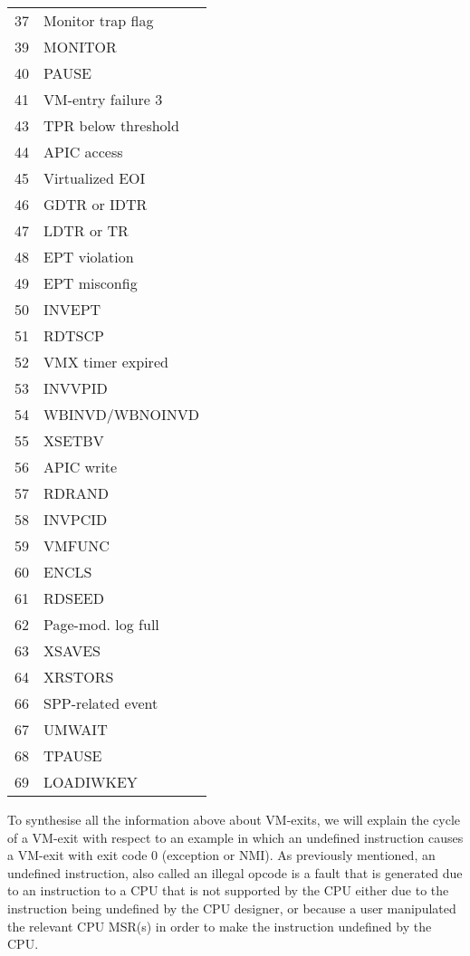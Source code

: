 \documentclass{report}
\begin{document}
\begin{spacing}{1.5}
\begin{longtable}{|c|l|}
\large{37} & \large{Monitor trap flag} \\
\large{39} & \large{MONITOR} \\
\large{40} & \large{PAUSE} \\
\large{41} & \large{VM-entry failure 3} \\
\large{43} & \large{TPR below threshold} \\
\large{44} & \large{APIC access} \\
\large{45} & \large{Virtualized EOI} \\
\large{46} & \large{GDTR or IDTR} \\
\large{47} & \large{LDTR or TR} \\
\large{48} & \large{EPT violation} \\
\large{49} & \large{EPT misconfig} \\
\large{50} & \large{INVEPT} \\
\large{51} & \large{RDTSCP} \\
\large{52} & \large{VMX timer expired} \\
\large{53} & \large{INVVPID} \\
\large{54} & \large{WBINVD/WBNOINVD} \\
\large{55} & \large{XSETBV} \\
\large{56} & \large{APIC write} \\
\large{57} & \large{RDRAND} \\
\large{58} & \large{INVPCID} \\
\large{59} & \large{VMFUNC} \\
\large{60} & \large{ENCLS} \\
\large{61} & \large{RDSEED} \\
\large{62} & \large{Page-mod. log full} \\
\large{63} & \large{XSAVES} \\
\large{64} & \large{XRSTORS} \\
\large{66} & \large{SPP-related event} \\
\large{67} & \large{UMWAIT} \\
\large{68} & \large{TPAUSE} \\
\large{69} & \large{LOADIWKEY} \\
\end{longtable}
\leavevmode\newline



{\large
To synthesise all the information above about VM-exits, we will explain the cycle of a VM-exit with respect to an example in which an undefined instruction causes a VM-exit with exit code 0 (exception or NMI). As previously mentioned, an undefined instruction, also called an illegal opcode is a fault that is generated due to an instruction to a CPU that is not supported by the CPU either due to the instruction being undefined by the CPU designer, or because a user manipulated the relevant CPU MSR(s) in order to make the instruction undefined by the CPU.
\newline
}



\end{spacing}
\end{document}
